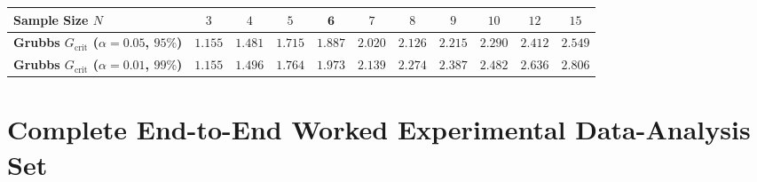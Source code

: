 \begin{itemize}
\begin{center}
  \setlength{\tabcolsep}{5.5pt}
  \begin{tabular}{@{}lcccccccccc@{}}
  \toprule
  \textbf{Sample Size $N$} & $3$ & $4$ & $5$ & $\mathbf{6}$ & $7$ & $8$ & $9$ & $10$ & $12$ & $15$ \\
  \midrule
  \textbf{Grubbs $G_{\mathrm{crit}}$ ($\alpha=0.05$, $95\%$)} & $1.155$ & $1.481$ & $1.715$ & $\mathbf{1.887}$ & $2.020$ & $2.126$ & $2.215$ & $2.290$ & $2.412$ & $2.549$ \\
  \textbf{Grubbs $G_{\mathrm{crit}}$ ($\alpha=0.01$, $99\%$)} & $1.155$ & $1.496$ & $1.764$ & $\mathbf{1.973}$ & $2.139$ & $2.274$ & $2.387$ & $2.482$ & $2.636$ & $2.806$ \\
  \bottomrule
  \end{tabular}
  \end{center}
\end{itemize}

\section{Complete End-to-End Worked Experimental Data-Analysis Set}\label{sec:18.6}

